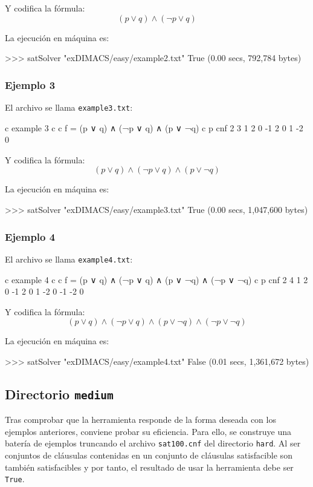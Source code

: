 Y codifica la fórmula:
$$(p \vee q) \wedge (\neg p \vee q)$$

La ejecución en máquina es:
\begin{code}
>>> satSolver "exDIMACS/easy/example2.txt"
True
(0.00 secs, 792,784 bytes)
\end{code}
\subsubsection{Ejemplo 3}
El archivo se llama \texttt{example3.txt}:
\begin{codigo}
c example 3
c 
c f = (p ∨ q) ∧ (¬p ∨ q) ∧ (p ∨ ¬q)
c
p cnf 2 3
1 2 0
-1 2 0
1 -2 0
\end{codigo}

Y codifica la fórmula:
$$(p \vee q)\wedge (\neg p \vee q)\wedge ( p \vee \neg q)$$

La ejecución en máquina es:
\begin{code}
>>> satSolver "exDIMACS/easy/example3.txt"
True
(0.00 secs, 1,047,600 bytes)
\end{code}
\subsubsection{Ejemplo 4}
El archivo se llama \texttt{example4.txt}:
\begin{codigo}
c example 4
c 
c f = (p ∨ q) ∧ (¬p ∨ q) ∧ (p ∨ ¬q) ∧ (¬p ∨ ¬q)
c
p cnf 2 4
1 2 0
-1 2 0
1 -2 0
-1 -2 0
\end{codigo}

Y codifica la fórmula:
$$(p \vee q)\wedge (\neg p \vee q)\wedge ( p \vee \neg q)\wedge (\neg p \vee \neg q)$$

La ejecución en máquina es:
\begin{code}
>>> satSolver "exDIMACS/easy/example4.txt"
False
(0.01 secs, 1,361,672 bytes)
\end{code}

\newpage
\subsection{Directorio \texttt{medium}}
Tras comprobar que la herramienta responde de la forma deseada con los ejemplos anteriores, conviene probar su eficiencia. Para ello, se construye una batería de ejemplos truncando el archivo \texttt{sat100.cnf} del directorio \texttt{hard}. Al ser conjuntos de cláusulas contenidas en un conjunto de cláusulas satisfacible son también satisfacibles y por tanto, el resultado de usar la herramienta debe ser \texttt{True}.

